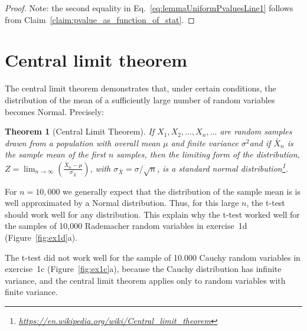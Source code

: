 \documentclass[12pt]{article}
\newtheorem{theorem}{Theorem}
\begin{document}
\begin{appendices}
\begin{proof}
Note: the second equality in Eq.~\ref{eq:lemmaUniformPvaluesLine1} follows
from Claim~\ref{claim:pvalue_as_function_of_stat}.

\end{proof}

\section{Central limit theorem}
\label{sec:clt}

The central limit theorem demonstrates that, under certain conditions, the
distribution of the mean of a sufficiently large number of random variables
becomes Normal. Precisely:

\begin{theorem}[Central Limit Theorem]

If $X_{1},X_{2},\dots ,X_{n},\dots$ are random samples drawn from a population
    with overall mean $\mu$ and finite variance $\sigma^{2}$and if $\bar
    {X}_{n}$ is the sample mean of the first $n$ samples, then the limiting
    form of the distribution,
    $Z=\lim_{n\to\infty}\left(\frac{\bar{X}_{n}-\mu}{\sigma_{\bar{X}}}\right)$,
    with $\sigma _{\bar{X}}=\sigma/\sqrt{n}$, is a standard normal
    distribution\footnote{\url{https://en.wikipedia.org/wiki/Central_limit_theorem}}.

\end{theorem}

For $n=10,000$ we generally expect that the distribution of the sample mean is
is well approximated by a Normal distribution. Thus, for this large $n$, the
t-test should work well for any distribution. This explain why the t-test
worked well for the samples of 10,000 Rademacher random variables in
exercise~1d (Figure~\ref{fig:ex1d}a).

The t-test did not work well for the sample of 10.000 Cauchy random variables
in exercise~1c (Figure~\ref{fig:ex1c}a), because the Cauchy distribution has
infinite variance, and the central limit theorem applies only to random
variables with finite variance.

\end{appendices}
\end{document}
